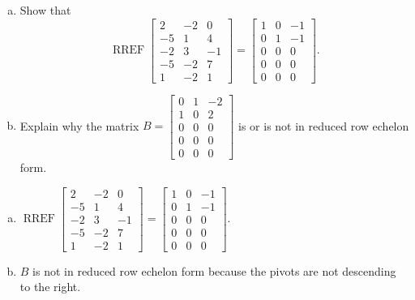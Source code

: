 
\begin{exerciseStatement}

\begin{enumerate}[(a)]
\item Show that \[\operatorname{RREF} \left[\begin{array}{ccc}
2 & -2 & 0 \\
-5 & 1 & 4 \\
-2 & 3 & -1 \\
-5 & -2 & 7 \\
1 & -2 & 1
\end{array}\right] = \left[\begin{array}{ccc}
1 & 0 & -1 \\
0 & 1 & -1 \\
0 & 0 & 0 \\
0 & 0 & 0 \\
0 & 0 & 0
\end{array}\right] .\]
\item Explain why the matrix \(B= \left[\begin{array}{ccc}
0 & 1 & -2 \\
1 & 0 & 2 \\
0 & 0 & 0 \\
0 & 0 & 0 \\
0 & 0 & 0
\end{array}\right] \) is or is not in reduced row echelon form.
\end{enumerate}
    
\end{exerciseStatement}
    
\begin{exerciseAnswer} 

\begin{enumerate}[(a)]
\item \(\operatorname{RREF} \left[\begin{array}{ccc}
2 & -2 & 0 \\
-5 & 1 & 4 \\
-2 & 3 & -1 \\
-5 & -2 & 7 \\
1 & -2 & 1
\end{array}\right] = \left[\begin{array}{ccc}
1 & 0 & -1 \\
0 & 1 & -1 \\
0 & 0 & 0 \\
0 & 0 & 0 \\
0 & 0 & 0
\end{array}\right] .\)
\item \(B\) is not in reduced row echelon form because the pivots are not descending to the right. 
\end{enumerate}
    
\end{exerciseAnswer}
    
